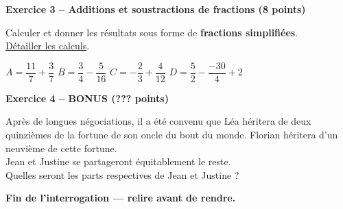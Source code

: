 \documentclass[12pt,a4paper]{exam}
\begin{document}
\noindent\hrulefill
\vspace{0.5cm}


\textbf{Exercice 3 – Additions et soustractions de fractions (8 points)}
\vspace{5pt}

Calculer et donner les résultats sous forme de \textbf{fractions simplifiées}.
\\\underline{Détailler les calculs}.

\vspace{5pt}

\begin{questions}
    \question $A = \dfrac{11}{7} + \dfrac{3}{7}$
    \vspace{5pt}
    \question $B = \dfrac{3}{4} - \dfrac{5}{16}$
    \vspace{5pt}
    \question $C = -\dfrac{2}{3} + \dfrac{4}{12}$
    \vspace{5pt}
    \question $D = \dfrac{5}{2} - \dfrac{-30}{4} + 2$
\end{questions}

\vspace{10pt}

\noindent\hrulefill
\vspace{0.5cm}


\textbf{Exercice 4 – BONUS (??? points)}
\vspace{5pt}

Après de longues négociations, il a été convenu que Léa héritera de deux quinzièmes de la 
fortune de son oncle du bout du monde. Florian héritera d'un neuvième de cette fortune.
\\Jean et Justine se partageront équitablement le reste.
\vspace{10pt}
\\
Quelles seront les parts respectives de Jean et Justine ?
\vspace{10pt}

\noindent\hrulefill
\vspace{0.5cm}


\begin{center}
\textbf{Fin de l'interrogation — relire avant de rendre.}    
\end{center}
\end{document}
